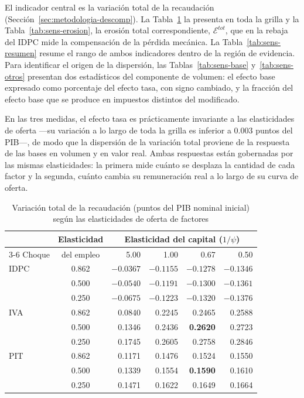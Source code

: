 \documentclass[11pt]{article}
\begin{document}
El indicador central es la variación total de la recaudación (Sección~\ref{sec:metodologia-descomp}). La Tabla~\ref{tab:sens-total} la presenta en toda la grilla y la Tabla~\ref{tab:sens-erosion}, la erosión total correspondiente, $\mathcal{E}^{tot}$, que en la rebaja del IDPC mide la compensación de la pérdida mecánica. La Tabla~\ref{tab:sens-resumen} resume el rango de ambos indicadores dentro de la región de evidencia. Para identificar el origen de la dispersión, las Tablas~\ref{tab:sens-base} y~\ref{tab:sens-otros} presentan dos estadísticos del componente de volumen: el efecto base expresado como porcentaje del efecto tasa, con signo cambiado, y la fracción del efecto base que se produce en impuestos distintos del modificado.

En las tres medidas, el efecto tasa es prácticamente invariante a las elasticidades de oferta ---su variación a lo largo de toda la grilla es inferior a 0.003 puntos del PIB---, de modo que la dispersión de la variación total proviene de la respuesta de las bases en volumen y en valor real. Ambas respuestas están gobernadas por las mismas elasticidades: la primera mide cuánto se desplaza la cantidad de cada factor y la segunda, cuánto cambia su remuneración real a lo largo de su curva de oferta.

\begin{table}[H]
\centering
\caption{Variación total de la recaudación (puntos del PIB nominal inicial) según las elasticidades de oferta de factores}
\label{tab:sens-total}
\small
\begin{tabular}{|l|c|r|r|r|r|}
  \hline
  & Elasticidad & \multicolumn{4}{c|}{Elasticidad del capital ($1/\psi$)} \\
  \cline{3-6}
  Choque & del empleo & 5.00 & 1.00 & 0.67 & 0.50 \\
  \hline
  IDPC & 0.862 & $-0.0367$ & $-0.1155$ & $-0.1278$ & $-0.1346$ \\
  & 0.500 & $-0.0540$ & $-0.1191$ & $\mathbf{-0.1300}$ & $-0.1361$ \\
  & 0.250 & $-0.0675$ & $-0.1223$ & $-0.1320$ & $-0.1376$ \\
  \hline
  IVA & 0.862 & 0.0840 & 0.2245 & 0.2465 & 0.2588 \\
  & 0.500 & 0.1346 & 0.2436 & \textbf{0.2620} & 0.2723 \\
  & 0.250 & 0.1745 & 0.2605 & 0.2758 & 0.2846 \\
  \hline
  PIT & 0.862 & 0.1171 & 0.1476 & 0.1524 & 0.1550 \\
  & 0.500 & 0.1339 & 0.1554 & \textbf{0.1590} & 0.1610 \\
  & 0.250 & 0.1471 & 0.1622 & 0.1649 & 0.1664 \\
  \hline
\end{tabular}
\end{table}
\end{document}
